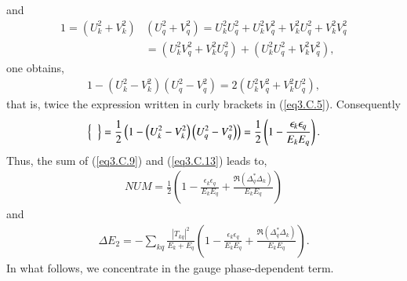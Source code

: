 and
\begin{align}
\nonumber 1=\left(U_k^2+V_k^2\right)&\left(U_q^2+V_q^2\right)=U_k^2U_q^2+U_k^2V_q^2+V_k^2U_q^2+V_k^2V_q^2\\
&=\left(U_k^2V_q^2+V_k^2U_q^2\right)+\left(U_k^2U_q^2+V_k^2V_q^2\right),
\end{align}
one obtains,
\begin{align}
1-\left(U_k^2-V_k^2\right)\left(U_q^2-V_q^2\right)=2\left(U_k^2V_q^2+V_k^2U_q^2\right),
\end{align}
that is, twice the expression written in curly brackets in (\ref{eq3.C.5}). Consequently
\begin{align}\label{eq3.C.13}
\left\{\vphantom{\left(U_q^2-V_q^2\right)}\;\;\right\}=\frac{1}{2}\left(1-\left(U_k^2-V_k^2\right)\left(U_q^2-V_q^2\right)\right)=\frac{1}{2}\left(1-\frac{\epsilon_k\epsilon_q}{E_kE_q}\right).
\end{align}
Thus, the sum of (\ref{eq3.C.9}) and (\ref{eq3.C.13}) leads to,
\begin{align}
NUM=\frac{1}{2}\left(1-\frac{\epsilon_k\epsilon_q}{E_kE_q}+\frac{\Re(\Delta_q^*\Delta_k)}{E_kE_q}\right)
\end{align}
and
\begin{align}
\Delta E_2=-\sum_{kq}\frac{|T_{kq}|^2}{E_k+E_q}\left(1-\frac{\epsilon_k\epsilon_q}{E_kE_q}+\frac{\Re(\Delta_q^*\Delta_k)}{E_kE_q}\right).
\end{align}
In what follows, we concentrate in the gauge phase-dependent term. 


